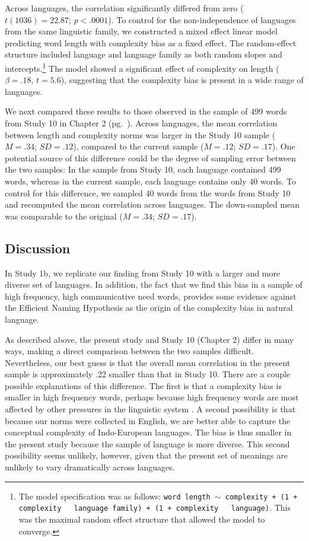 Across languages,  the correlation significantly differed from zero ($ t(1036)= 22.87$; $p <.0001$).  To control for the non-independence of languages from the same linguistic family, we constructed a mixed effect linear model predicting word length with complexity bias as a fixed effect. The random-effect structure included language and language family as both random slopes and intercepts.\footnote{The model specification was as follows: \texttt{word length $\sim$ complexity + (1 + complexity ~\textbar~language family) +  (1 + complexity ~\textbar~language)}. This was the maximal random effect structure that allowed the model to converge.}  The model showed a significant effect of complexity on length ($\beta = .18$, $t = 5.6$), suggesting that the complexity bias is present in a wide range of languages.

We next compared these results to those observed in the sample of 499 words from Study 10 in Chapter 2 (pg.\ \pageref{ch2-10}). Across languages, the mean correlation between length and complexity norms was larger in the Study 10 sample ($M = .34$; $SD = .12$), compared to the current sample ($M = .12$; $SD = .17$). One potential source of this difference could be the degree of sampling error between the two samples: In the sample from Study 10, each language contained 499 words, whereas in the current sample, each language contains only 40 words. To control for this difference, we sampled 40 words from the words from Study 10 and recomputed  the mean correlation across languages. The down-sampled mean was comparable to the original  ($M = .34$; $SD = .17$). 

\subsection{Discussion}

In Study 1b, we replicate our finding from Study 10 with a larger and more diverse set of languages. In addition, the fact that we find this bias in a sample of high frequency, high communicative need words, provides some evidence against the Efficient Naming Hypothesis as the origin of the complexity bias in natural language.

As described above, the present study and Study 10 (Chapter 2) differ in many ways, making a direct comparison between the two samples difficult. Nevertheless, our best guess is that the overall mean correlation in the present sample is approximately .22  smaller than that in Study 10.  There are a couple possible explanations of this difference. The first is that a complexity bias is smaller in high frequency words, perhaps because high frequency words are most affected by other pressures in the linguistic system \cite{lieberman2007quantifying}. A second possibility is that because our norms were collected in English, we are better able to capture the conceptual complexity of Indo-European languages. The bias is thus smaller in the present study because the sample of language is more diverse.  This second possibility seems unlikely, however, given that the present set of meanings are unlikely to vary dramatically across languages. 


